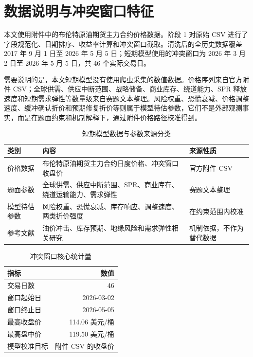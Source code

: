 \documentclass[UTF8,zihao=-4,fontset=fandol]{ctexart}
\begin{document}
\section{数据说明与冲突窗口特征}

本文使用附件中的布伦特原油期货主力合约价格数据。阶段 1 对原始 CSV 进行了字段规范化、日期排序、收益率计算和冲突窗口截取。清洗后的全历史数据覆盖 2017 年 9 月 1 日至 2026 年 5 月 5 日；短期模型使用的冲突窗口为 2026 年 3 月 2 日至 2026 年 5 月 5 日，共 46 个实际交易日。

需要说明的是，本文短期模型没有使用爬虫采集的数值数据。价格序列来自官方附件 CSV；全球供需、供应中断范围、战略储备、商业库存、绕道能力、SPR 释放速度和短期需求弹性等数量级来自赛题文本整理。风险权重、恐慌衰减、价格调整速度、缓冲确认折价和预期修复折价等则属于模型待估参数，它们不是外部观测事实，而是在题面约束和机制解释下，通过附件价格路径校准得到。

\begin{table}[H]
\centering
\caption{短期模型数据与参数来源分类}
\begin{tabularx}{\linewidth}{lXl}
\toprule
类别 & 内容 & 来源性质 \\
\midrule
价格数据 & 布伦特原油期货主力合约日度价格、冲突窗口收盘价 & 官方附件 CSV \\
题面参数 & 全球供需、供应中断范围、SPR、商业库存、绕道运输能力、需求弹性 & 赛题文本整理 \\
模型待估参数 & 风险权重、恐慌衰减、库存响应、调整速度、两类折价强度 & 在约束范围内校准 \\
参考文献 & 油价冲击、库存预期、地缘风险和需求弹性相关研究 & 机制依据，不作为替代数据 \\
\bottomrule
\end{tabularx}
\end{table}

\begin{table}[H]
\centering
\caption{冲突窗口核心统计量}
\begin{tabular}{lr}
\toprule
指标 & 数值 \\
\midrule
交易日数 & 46 \\
窗口起始日 & 2026-03-02 \\
窗口终止日 & 2026-05-05 \\
最高收盘价 & 114.06 美元/桶 \\
最高盘中价 & 119.50 美元/桶 \\
模型校准目标 & 附件 CSV 的收盘价 \\
\bottomrule
\end{tabular}
\end{table}
\end{document}
